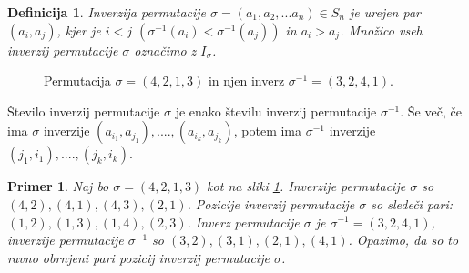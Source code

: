 \documentclass[a4paper, 12pt]{book}
\newtheorem{definicija}{Definicija}[chapter]
\newtheorem{primer}{Primer}[chapter]
\let\ab\allowbreak
\begin{document}
\begin{definicija}
    Inverzija permutacije $\sigma = (a_1, a_2,... a_n) \in S_n$ je urejen par $(a_i, a_j)$, kjer je $i < j$ $(\sigma^{-1}(a_i) < \sigma^{-1}(a_j))$ in $a_i > a_j$. Množico vseh inverzij permutacije $\sigma$ označimo z $I_{\sigma}$.
\end{definicija}

\begin{figure}[h]
    \begin{center}
    \end{center}
    \caption{Permutacija $\sigma = (4, 2, 1, 3)$ in njen inverz $\sigma^{-1} = (3, 2, 4, 1)$.}
    \label{permutacija_4213}
\end{figure}

Število inverzij permutacije $\sigma$ je enako številu inverzij permutacije $\sigma^{-1}$. Še več, če ima $\sigma$ inverzije $(a_{i_1}, a_{j_1}), ...., (a_{i_k}, a_{j_k})$, potem ima $\sigma^{-1}$ inverzije $(j_1, i_1), ...., (j_k, i_k)$.

\begin{primer}
    Naj bo $\sigma = (4, 2, 1, 3)$ kot na sliki \ref{permutacija_4213}. Inverzije permutacije $\sigma$ so $(4, 2), (4, 1), (4, 3), (2, 1)$. Pozicije inverzij permutacije $\sigma$ so sledeči pari: $(1, 2), (1, 3), (1, 4), (2, 3)$. Inverz permutacije $\sigma$ je $\sigma^{-1} = (3, 2, 4, 1)$, inverzije permutacije $\sigma^{-1}$ so $(3, 2), \ab (3, 1), (2, 1), (4, 1)$. Opazimo, da so to ravno obrnjeni pari pozicij inverzij permutacije $\sigma$.
\end{primer}
\end{document}
